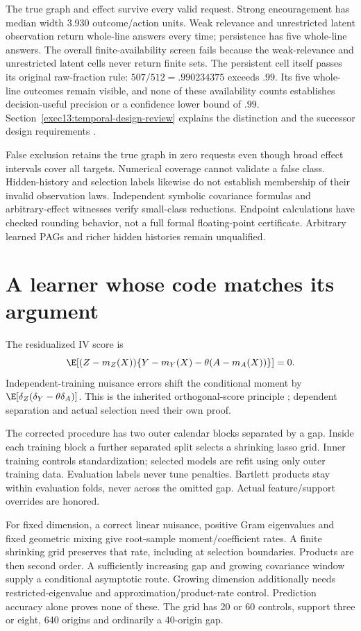 The true graph and effect survive every valid request. Strong encouragement has median width 3.930 outcome/action units. Weak relevance and unrestricted latent observation return whole-line answers every time; persistence has five whole-line answers. The overall finite-availability screen fails because the weak-relevance and unrestricted latent cells never return finite sets. The persistent cell itself passes its original raw-fraction rule: $507/512=.990234375$ exceeds $.99$. Its five whole-line outcomes remain visible, and none of these availability counts establishes decision-useful precision or a confidence lower bound of $.99$. Section~\ref{exec13:temporal-design-review} explains the distinction and the successor design requirements \cite{exec13_temporal_design}.

False exclusion retains the true graph in zero requests even though broad effect intervals cover all targets. Numerical coverage cannot validate a false class. Hidden-history and selection labels likewise do not establish membership of their invalid observation laws. Independent symbolic covariance formulas and arbitrary-effect witnesses verify small-class reductions. Endpoint calculations have checked rounding behavior, not a full formal floating-point certificate. Arbitrary learned PAGs and richer hidden histories remain unqualified.

\section{A learner whose code matches its argument}
The residualized IV score is
\[
 \E[(Z-m_Z(X))\{Y-m_Y(X)-\theta(A-m_A(X))\}]=0.
\]
Independent-training nuisance errors shift the conditional moment by $\E[\delta_Z(\delta_Y-\theta\delta_A)]$. This is the inherited orthogonal-score principle \cite{dml2018}; dependent separation and actual selection need their own proof.

The corrected procedure has two outer calendar blocks separated by a gap. Inside each training block a further separated split selects a shrinking lasso grid. Inner training controls standardization; selected models are refit using only outer training data. Evaluation labels never tune penalties. Bartlett products stay within evaluation folds, never across the omitted gap. Actual feature/support overrides are honored.

For fixed dimension, a correct linear nuisance, positive Gram eigenvalues and fixed geometric mixing give root-sample moment/coefficient rates. A finite shrinking grid preserves that rate, including at selection boundaries. Products are then second order. A sufficiently increasing gap and growing covariance window supply a conditional asymptotic route. Growing dimension additionally needs restricted-eigenvalue and approximation/product-rate control. Prediction accuracy alone proves none of these. The grid has 20 or 60 controls, support three or eight, 640 origins and ordinarily a 40-origin gap.

